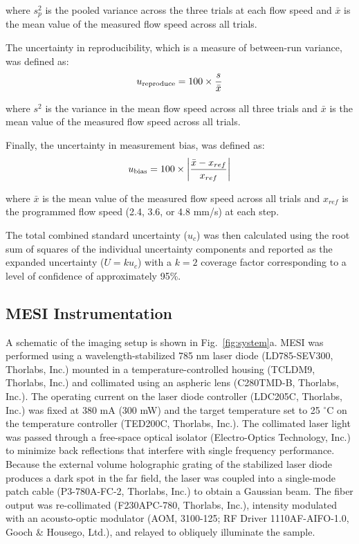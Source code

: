 \documentclass[12pt]{spieman}
\begin{document}
\begin{spacing}{2}
\noindent where $s_p^2$ is the pooled variance across the three trials at each flow speed and $\bar{x}$ is the mean value of the measured flow speed across all trials.

The uncertainty in reproducibility, which is a measure of between-run variance, was defined as:
%
\begin{equation}
    \label{eq:u_reproduce}
    u_\textnormal{reproduce} = 100 \times \frac{s}{\bar{x}}
\end{equation}

\noindent where $s^2$ is the variance in the mean flow speed across all three trials and $\bar{x}$ is the mean value of the measured flow speed across all trials.

Finally, the uncertainty in measurement bias, was defined as:
%
\begin{equation}
    \label{eq:u_bias}
    u_\textnormal{bias} = 100 \times \left| \frac{\bar{x} - x_{ref}}{x_{ref}} \right|
\end{equation}

\noindent where $\bar{x}$ is the mean value of the measured flow speed across all trials and $x_{ref}$ is the programmed flow speed (2.4, 3.6, or 4.8 mm/s) at each step.

The total combined standard uncertainty ($u_c$) was then calculated using the root sum of squares of the individual uncertainty components and reported as the expanded uncertainty ($U=ku_c$) with a $k=2$ coverage factor corresponding to a level of confidence of approximately 95\%.


\subsection{MESI Instrumentation}

A schematic of the imaging setup is shown in Fig.~\ref{fig:system}a. MESI was performed \cite{Parthasarathy:2008el} using a wavelength-stabilized 785 nm laser diode (LD785-SEV300, Thorlabs, Inc.) mounted in a temperature-controlled housing (TCLDM9, Thorlabs, Inc.) and collimated using an aspheric lens (C280TMD-B, Thorlabs, Inc.). The operating current on the laser diode controller (LDC205C, Thorlabs, Inc.) was fixed at 380 mA (300 mW) and the target temperature set to 25 $^\circ$C on the temperature controller (TED200C, Thorlabs, Inc.). The collimated laser light was passed through a free-space optical isolator (Electro-Optics Technology, Inc.) to minimize back reflections that interfere with single frequency performance. Because the external volume holographic grating of the stabilized laser diode produces a dark spot in the far field, the laser was coupled into a single-mode patch cable (P3-780A-FC-2, Thorlabs, Inc.) to obtain a Gaussian beam. The fiber output was re-collimated (F230APC-780, Thorlabs, Inc.), intensity modulated with an acousto-optic modulator (AOM, 3100-125; RF Driver 1110AF-AIFO-1.0, Gooch \& Housego, Ltd.), and relayed to obliquely illuminate the sample.


\end{spacing}
\end{document}
